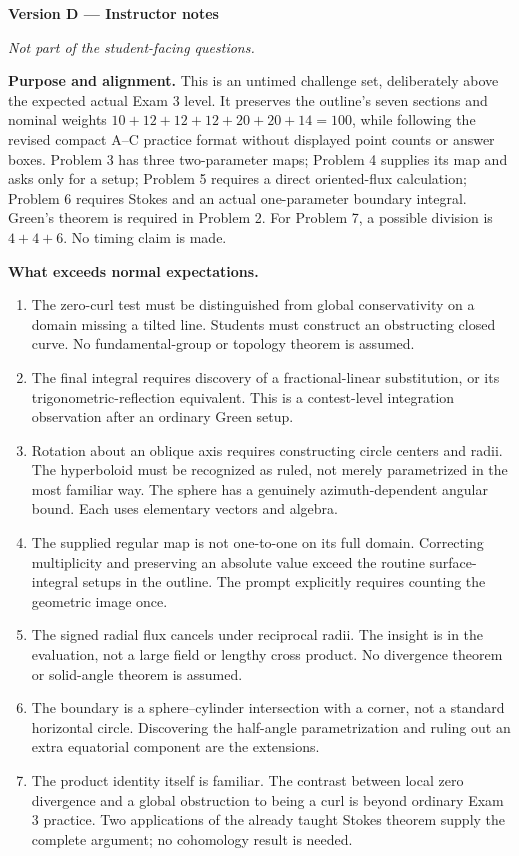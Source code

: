 \documentclass[11pt,letterpaper]{article}
\begin{document}
\clearpage
{\large\bfseries Version D --- Instructor notes}
\par\textit{Not part of the student-facing questions.}

\textbf{Purpose and alignment.}
This is an untimed challenge set, deliberately above the expected actual
Exam 3 level. It preserves the outline's seven sections and nominal
weights $10+12+12+12+20+20+14=100$, while following the revised compact
A--C practice format without displayed point counts or answer boxes.
Problem 3 has three two-parameter maps; Problem 4 supplies its map and
asks only for a setup; Problem 5 requires a direct oriented-flux
calculation; Problem 6 requires Stokes and an actual one-parameter
boundary integral. Green's theorem is required in Problem 2. For Problem
7, a possible division is $4+4+6$. No timing claim is made.

\textbf{What exceeds normal expectations.}
\begin{enumerate}[label=\textbf{\arabic*.},itemsep=5pt]
\item The zero-curl test must be distinguished from global conservativity
on a domain missing a tilted line. Students must construct an obstructing
closed curve. No fundamental-group or topology theorem is assumed.
\item The final integral requires discovery of a fractional-linear
substitution, or its trigonometric-reflection equivalent. This is a
contest-level integration observation after an ordinary Green setup.
\item Rotation about an oblique axis requires constructing circle centers
and radii. The hyperboloid must be recognized as ruled, not merely
parametrized in the most familiar way. The sphere has a genuinely
azimuth-dependent angular bound. Each uses elementary vectors and algebra.
\item The supplied regular map is not one-to-one on its full domain.
Correcting multiplicity and preserving an absolute value exceed the
routine surface-integral setups in the outline. The prompt explicitly
requires counting the geometric image once.
\item The signed radial flux cancels under reciprocal radii. The insight
is in the evaluation, not a large field or lengthy cross product.
No divergence theorem or solid-angle theorem is assumed.
\item The boundary is a sphere--cylinder intersection with a corner, not
a standard horizontal circle. Discovering the half-angle parametrization
and ruling out an extra equatorial component are the extensions.
\item The product identity itself is familiar. The contrast between
local zero divergence and a global obstruction to being a curl is beyond
ordinary Exam 3 practice. Two applications of the already taught Stokes
theorem supply the complete argument; no cohomology result is needed.
\end{enumerate}
\end{document}

